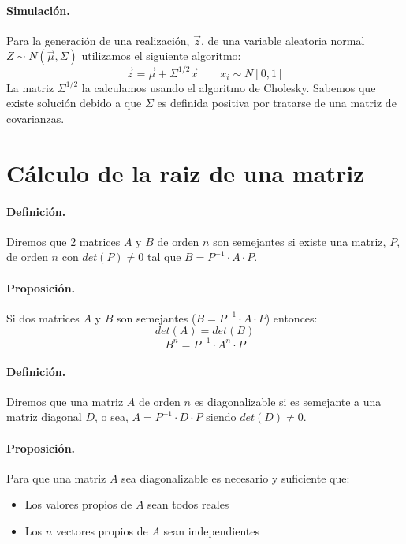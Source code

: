 \paragraph{Simulaci\'on.} Para la generaci\'on de una realizaci\'on, $\vec{z}$, 
de una variable aleatoria normal $Z \sim N(\vec{\mu}, \Sigma)$ utilizamos el 
siguiente algoritmo:
\begin{displaymath}
\vec{z} = \vec{\mu} + \Sigma^{1/2} \vec{x}
\qquad x_i \sim N[0,1]
\end{displaymath}
La matriz $\Sigma^{1/2}$ la calculamos usando el algoritmo de Cholesky. Sabemos 
que existe soluci\'on debido a que $\Sigma$ es definida positiva por tratarse
de una matriz de covarianzas.


\section{C\'alculo de la raiz de una matriz}
\label{apendix:sqrtmat}

\paragraph{Definici\'on.}
Diremos que 2 matrices $A$ y $B$ de orden $n$ son semejantes si existe una 
matriz, $P$, de orden $n$ con $det(P) \neq 0$ tal que 
$B = P^{-1} \cdot A \cdot P$.


\paragraph{Proposici\'on.} Si dos matrices $A$ y $B$ son semejantes 
($B = P^{-1} \cdot A \cdot P$) entonces:
\begin{displaymath}
det(A) = det(B)
\end{displaymath}
\begin{displaymath}
B^n = P^{-1} \cdot A^{n} \cdot P
\end{displaymath}

\paragraph{Definici\'on.} 
Diremos que una matriz $A$ de orden $n$ es diagonalizable si es semejante a una 
matriz diagonal $D$, o sea, $A = P^{-1} \cdot D \cdot P$ siendo $det(D) \neq 0$.

\paragraph{Proposici\'on.} 
Para que una matriz $A$ sea diagonalizable es necesario y suficiente que:
\begin{itemize}
\item Los valores propios de $A$ sean todos reales
\item Los $n$ vectores propios de $A$ sean independientes
\end{itemize}

